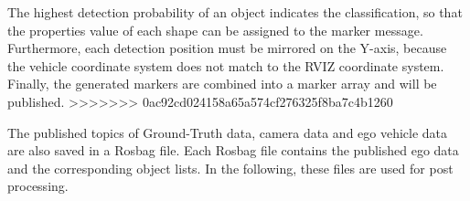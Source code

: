 The highest detection probability of an object indicates the classification, so that the properties value of each shape can be assigned to the marker message. Furthermore, each detection position must be mirrored on the Y-axis, because the vehicle coordinate system does not match to the RVIZ coordinate system. Finally, the generated markers are combined into a marker array and will be published.
>>>>>>> 0ac92cd024158a65a574cf276325f8ba7c4b1260

The published topics of Ground-Truth data, camera data and ego vehicle data are also saved in a Rosbag file. Each Rosbag file contains the published ego data and the corresponding object lists. In the following, these files are used for post processing.
